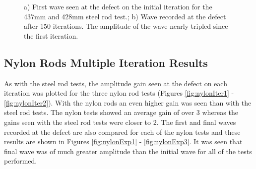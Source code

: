   \begin{figure}
 \begin{subfigmatrix}{2}
 \end{subfigmatrix}
 
    \caption[]
    { \label{fig:steelExp3}
    a) First wave seen at the defect on the initial iteration for the 437mm and 428mm steel rod test.; b) Wave recorded at the defect after 150 iterations. The amplitude of the wave nearly tripled since the first iteration.
  }
 \end{figure}
 
 \subsection{Nylon Rods Multiple Iteration Results}
 As with the steel rod tests, the amplitude gain seen at the defect on each iteration was plotted for the three nylon rod tests (Figures \ref{fig:nylonIter1} - \ref{fig:nylonIter2}). With the nylon rods an even higher gain was seen than with the steel rod tests. The nylon tests showed an average gain of over 3 whereas the gains seen with the steel rod tests were closer to 2. The first and final waves recorded at the defect are also compared for each of the nylon tests and these results are shown in Figures \ref{fig:nylonExp1} - \ref{fig:nylonExp3}. It was seen that final wave was of much greater amplitude than the initial wave for all of the tests performed.
 
